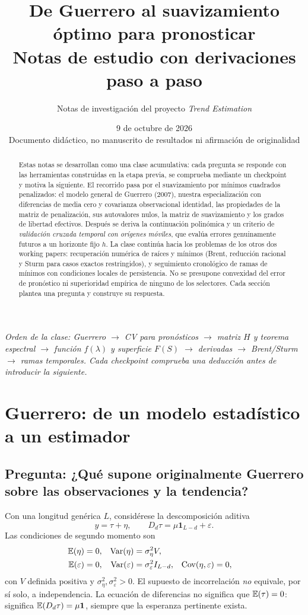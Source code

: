 \documentclass[11pt,letterpaper,parskip=half,headings=small]{scrartcl}
\title{\vspace{-1.7cm}\textbf{De Guerrero al suavizamiento óptimo para pronosticar}\\[5pt]
\large Notas de estudio con derivaciones paso a paso}
\author{Notas de investigación del proyecto \textit{Trend Estimation}}
\date{9 de octubre de 2026\\[6pt]\small Documento didáctico, no manuscrito de resultados ni afirmación de originalidad}
\theoremstyle{definition}\newtheorem{definicion}[proposicion]{Definición}
\theoremstyle{remark}\newtheorem{observacion}[proposicion]{Observación}
\newcommand{\Cov}{\operatorname{Cov}}\newcommand{\tr}{\operatorname{tr}}
\newcommand{\pregunta}[1]{\subsection{Pregunta: #1}}
\begin{document}
\maketitle
\begin{abstract}
Estas notas se desarrollan como una clase acumulativa: cada pregunta se responde con las herramientas construidas en la etapa previa, se comprueba mediante un checkpoint y motiva la siguiente. El recorrido pasa por el suavizamiento por mínimos cuadrados penalizados: el modelo general de Guerrero (2007), nuestra especialización con diferencias de media cero y covarianza observacional identidad, las propiedades de la matriz de penalización, sus autovalores nulos, la matriz de suavizamiento y los grados de libertad efectivos. Después se deriva la continuación polinómica y un criterio de \emph{validación cruzada temporal con orígenes móviles}, que evalúa errores genuinamente futuros a un horizonte fijo $h$. La clase continúa hacia los problemas de los otros dos working papers: recuperación numérica de raíces y mínimos (Brent, reducción racional y Sturm para casos exactos restringidos), y seguimiento cronológico de ramas de mínimos con condiciones locales de persistencia. No se presupone convexidad del error de pronóstico ni superioridad empírica de ninguno de los selectores. Cada sección plantea una pregunta y construye su respuesta.
\end{abstract}
\noindent\textit{Orden de la clase: Guerrero $\to$ CV para pronósticos $\to$ matriz $H$ y teorema espectral $\to$ función $f(\lambda)$ y superficie $F(S)$ $\to$ derivadas $\to$ Brent/Sturm $\to$ ramas temporales. Cada checkpoint comprueba una deducción antes de introducir la siguiente.}
\tableofcontents\clearpage

\section{Guerrero: de un modelo estadístico a un estimador}
\pregunta{¿Qué supone originalmente Guerrero sobre las observaciones y la tendencia?}
Con una longitud genérica $L$, considérese la descomposición aditiva
\begin{equation}y=\tau+\eta,\qquad D_d\tau=\mu\bm1_{L-d}+\varepsilon.\label{eq:modelo-general}\end{equation}
Las condiciones de segundo momento son
\begin{align}
\EE(\eta)&=0,&\Var(\eta)&=\sigma_\eta^2 V,\\
\EE(\varepsilon)&=0,&\Var(\varepsilon)&=\sigma_\varepsilon^2I_{L-d},&\Cov(\eta,\varepsilon)&=0,
\end{align}
con $V$ definida positiva y $\sigma_\eta^2,\sigma_\varepsilon^2>0$. El supuesto de incorrelación \emph{no} equivale, por sí solo, a independencia. La ecuación de diferencias no significa que $\mathbb E(\tau)=0$: significa $\mathbb E(D_d\tau)=\mu\bm1$, siempre que la esperanza pertinente exista.
\end{document}

